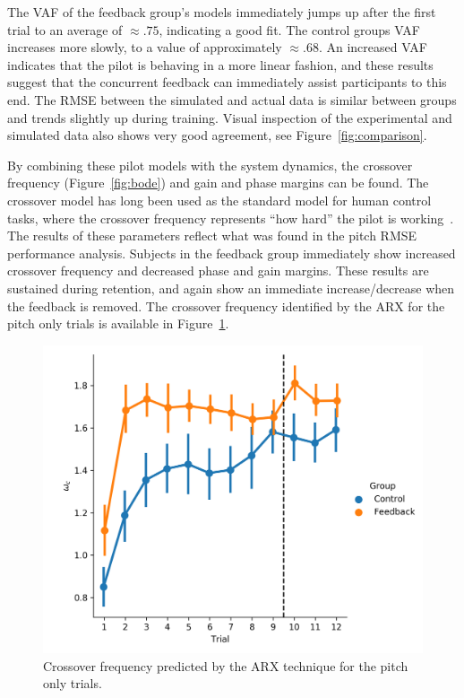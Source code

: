 The VAF of the feedback group's models immediately jumps up after the first trial to an average of $\approx.75$, indicating a good fit.
The control groups VAF increases more slowly, to a value of approximately $\approx.68$.
An increased VAF indicates that the pilot is behaving in a more linear fashion, and these results suggest that the concurrent feedback can immediately assist participants to this end.
The RMSE between the simulated and actual data is similar between groups and trends slightly up during training.
Visual inspection of the experimental and simulated data also shows very good agreement, see Figure~\ref{fig:comparison}.

By combining these pilot models with the system dynamics, the crossover frequency (Figure~\ref{fig:bode}) and gain and phase margins can be found.
The crossover model has long been used as the standard model for human control tasks, where the crossover frequency represents ``how hard'' the pilot is working~\citep{mcruer_dynamic_1957}.
The results of these parameters reflect what was found in the pitch RMSE performance analysis.
Subjects in the feedback group immediately show increased crossover frequency and decreased phase and gain margins.
These results are sustained during retention, and again show an immediate increase/decrease when the feedback is removed.
The crossover frequency identified by the ARX for the pitch only trials is available in Figure~\ref{fig:arx_crossover}.

\begin{figure}[tb]
    \centering
    \includegraphics[width=0.8\linewidth]{figures/Modeling/wc_arx.png}
    \caption[Crossover frequency (ARX)]{Crossover frequency predicted by the ARX technique for the pitch only trials.}
    \label{fig:arx_crossover}
\end{figure}

